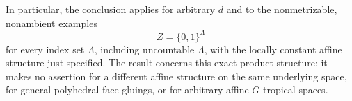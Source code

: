 In particular, the conclusion applies for arbitrary \(d\) and to the
nonmetrizable, nonambient examples
\[
                    Z=\{0,1\}^{\Lambda}
\]
for every index set \(\Lambda\), including uncountable \(\Lambda\), with
the locally constant affine structure just specified.  The result concerns
this exact product structure; it makes no assertion for a different affine
structure on the same underlying space, for general polyhedral face
gluings, or for arbitrary affine \(G\)-tropical spaces.
